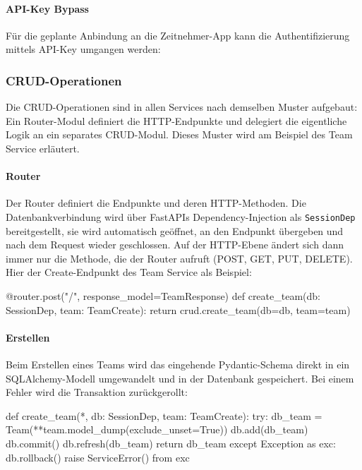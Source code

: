 
\paragraph{API-Key Bypass}
Für die geplante Anbindung an die Zeitnehmer-App kann die Authentifizierung mittels \gls{API}-Key 
umgangen werden:


\subsubsection{CRUD-Operationen}
\label{sec:impl_crud}
Die \gls{CRUD}-Operationen sind in allen Services nach demselben Muster 
aufgebaut: Ein Router-Modul definiert die HTTP-Endpunkte und 
delegiert die eigentliche Logik an ein separates \gls{CRUD}-Modul. 
Dieses Muster wird am Beispiel des Team Service erläutert.

\paragraph{Router}
Der Router definiert die Endpunkte und deren HTTP-Methoden. 
Die Datenbankverbindung wird über FastAPIs Dependency-Injection 
als \texttt{SessionDep} bereitgestellt, sie wird automatisch 
geöffnet, an den Endpunkt übergeben und nach dem Request 
wieder geschlossen. Auf der HTTP-Ebene ändert sich dann immer nur die Methode,
die der Router aufruft (POST, GET, PUT, DELETE).
Hier der Create-Endpunkt des Team Service als Beispiel:

\begin{CodeBox}[language=Python]
@router.post("/", response_model=TeamResponse)
def create_team(db: SessionDep, team: TeamCreate):
    return crud.create_team(db=db, team=team)
\end{CodeBox}

\paragraph{Erstellen}
Beim Erstellen eines Teams wird das eingehende Pydantic-Schema 
direkt in ein SQLAlchemy-Modell umgewandelt und in der Datenbank 
gespeichert. Bei einem Fehler wird die Transaktion zurückgerollt:
\begin{CodeBox}[language=Python, caption={Erstellen eines Teams}]
def create_team(*, db: SessionDep, team: TeamCreate):
    try:
        db_team = Team(**team.model_dump(exclude_unset=True))
        db.add(db_team)
        db.commit()
        db.refresh(db_team)
        return db_team
    except Exception as exc:
        db.rollback()
        raise ServiceError() from exc
\end{CodeBox}

